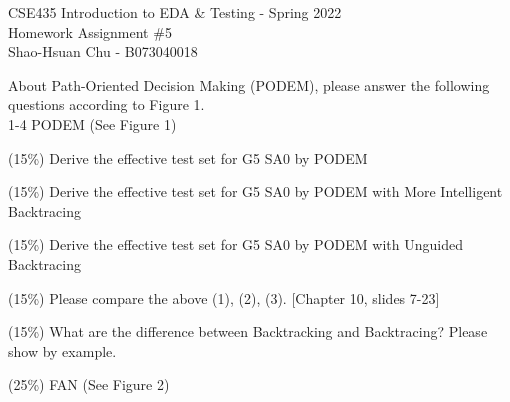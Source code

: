 \documentclass[12pt,answers]{exam}
\begin{document}
\begin{center}
\LARGE CSE435 Introduction to EDA \& Testing - Spring 2022 \\
\Large Homework Assignment \#5 \\
\Large Shao-Hsuan Chu - B073040018 \\
\end{center}
\bigskip

About Path-Oriented Decision Making (PODEM), please answer the following questions according to Figure 1. \\
1-4 PODEM (See Figure 1)
\begin{questions}
  \question (15\%) Derive the effective test set for G5 SA0 by PODEM
  
  \begin{solution}
  \end{solution}

  \question (15\%) Derive the effective test set for G5 SA0 by PODEM with More Intelligent Backtracing
  \begin{solution}
  \end{solution}

  \question (15\%) Derive the effective test set for G5 SA0 by PODEM with Unguided Backtracing
  \begin{solution}
  \end{solution}

  \question (15\%) Please compare the above (1), (2), (3). [Chapter 10, slides 7-23]
  \begin{solution}
  \end{solution}

  \question (15\%) What are the difference between Backtracking and Backtracing? Please show by example.
  \begin{solution}
  \end{solution}

  \question (25\%) FAN (See Figure 2)
  

\end{questions}
\end{document}
